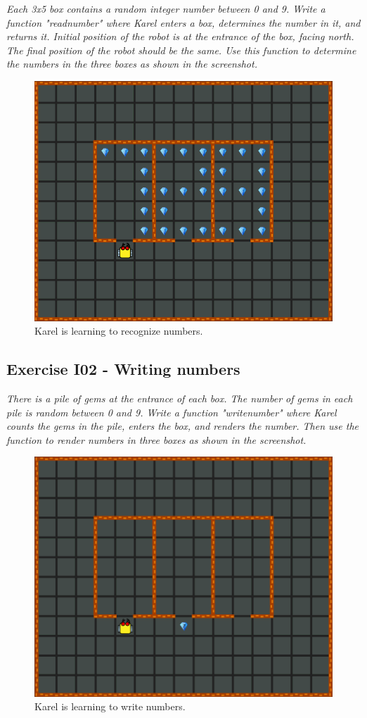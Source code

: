 {{{{{\em Each 3x5 box contains a random integer number between 0 and 9. Write a function "readnumber" 
where Karel enters a box, determines the number in it, and returns it. Initial position of the 
robot is at the entrance of the box, facing north. The final position of the robot should be the same. 
Use this function to determine the numbers in the three boxes as shown in the screenshot. }

\begin{figure}[!ht]
\begin{center}
\includegraphics[height=0.4\textwidth]{imgk/i01.png}
\end{center}
\vspace{-4mm}
\caption{Karel is learning to recognize numbers.}
\label{fig:g10}
\vspace{-4mm}
\end{figure}
\noindent
\newpage

\subsection{Exercise I02 - Writing numbers}

{\em There is a pile of gems at the entrance of each box. The number of gems in each pile is random between 0 and 9. Write a function "writenumber" where Karel counts the gems in the pile, enters the box, and renders the number. Then use the function to render numbers in three boxes as shown in the screenshot. }\\[-7mm]

\begin{figure}[!ht]
\begin{center}
\includegraphics[height=0.4\textwidth]{imgk/i02.png}
\end{center}
\vspace{-4mm}
\caption{Karel is learning to write numbers.}
\label{fig:g11}
\vspace{-10mm}
\end{figure}
\noindent

}}}}
